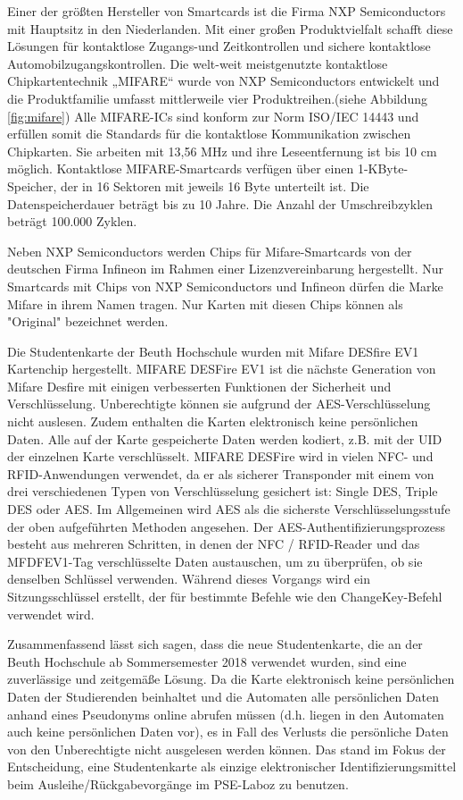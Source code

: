 Einer der größten Hersteller von Smartcards ist die Firma NXP Semiconductors mit Hauptsitz in den Niederlanden. Mit einer großen Produktvielfalt schafft diese Lösungen für kontaktlose Zugangs-und Zeitkontrollen und sichere kontaktlose Automobilzugangskontrollen. Die welt-weit meistgenutzte kontaktlose Chipkartentechnik „MIFARE“ wurde von NXP Semiconductors entwickelt und die Produktfamilie umfasst mittlerweile vier Produktreihen.(siehe Abbildung \ref{fig:mifare})\cite{website:9} Alle MIFARE-ICs sind konform zur Norm ISO/IEC 14443 und erfüllen somit die Standards für die kontaktlose Kommunikation zwischen Chipkarten. Sie arbeiten mit 13,56 MHz und ihre Leseentfernung ist bis 10 cm möglich. Kontaktlose MIFARE-Smartcards verfügen über einen 1-KByte-Speicher, der in 16 Sektoren mit jeweils 16 Byte unterteilt ist. Die Datenspeicherdauer beträgt bis zu 10 Jahre. Die Anzahl der Umschreibzyklen beträgt 100.000 Zyklen.

Neben NXP Semiconductors werden Chips für Mifare-Smartcards von der deutschen Firma Infineon im Rahmen einer Lizenzvereinbarung hergestellt\cite{website:11}. Nur Smartcards mit Chips von NXP Semiconductors und Infineon dürfen die Marke Mifare in ihrem Namen tragen. Nur Karten mit diesen Chips können als "Original" bezeichnet werden.

Die Studentenkarte der Beuth Hochschule wurden mit Mifare DESfire EV1 Kartenchip hergestellt. MIFARE DESFire EV1 ist die nächste Generation von Mifare Desfire mit einigen verbesserten Funktionen der Sicherheit und Verschlüsselung\cite[p.83]{chirico:smart_card}. Unberechtigte können sie aufgrund der AES-Verschlüsselung nicht auslesen. Zudem enthalten die Karten elektronisch keine persönlichen Daten\cite{website:12}. Alle auf der Karte gespeicherte Daten werden kodiert, z.B. mit der UID der einzelnen Karte verschlüsselt. MIFARE DESFire wird in vielen NFC- und RFID-Anwendungen verwendet, da er als sicherer Transponder mit einem von drei verschiedenen Typen von Verschlüsselung gesichert ist: Single DES, Triple DES oder AES. Im Allgemeinen wird AES als die sicherste Verschlüsselungsstufe der oben aufgeführten Methoden angesehen. Der AES-Authentifizierungsprozess besteht aus mehreren Schritten, in denen der NFC / RFID-Reader und das MFDFEV1-Tag verschlüsselte Daten austauschen, um zu überprüfen, ob sie denselben Schlüssel verwenden. Während dieses Vorgangs wird ein Sitzungsschlüssel erstellt, der für bestimmte Befehle wie den ChangeKey-Befehl verwendet wird\cite{website:10}.

Zusammenfassend lässt sich sagen, dass die neue Studentenkarte, die an der Beuth Hochschule ab Sommersemester 2018 verwendet wurden, sind eine zuverlässige und zeitgemäße Lösung. Da die Karte elektronisch keine persönlichen Daten der Studierenden beinhaltet und die Automaten alle persönlichen Daten anhand eines Pseudonyms online abrufen müssen (d.h. liegen in den Automaten auch keine persönlichen Daten vor), es in Fall des Verlusts die persönliche Daten von den Unberechtigte nicht ausgelesen werden können\cite{website:12}. Das stand im Fokus der Entscheidung, eine Studentenkarte als einzige elektronischer Identifizierungsmittel beim Ausleihe/Rückgabevorgänge im PSE-Laboz zu benutzen.

